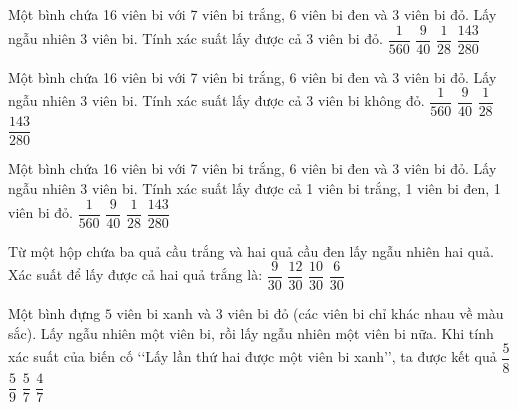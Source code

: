 \begin{ex}
Một bình chứa 16 viên bi với 7 viên bi trắng, 6 viên bi đen và 3 viên bi đỏ. Lấy ngẫu nhiên 3 viên bi. Tính xác suất lấy được cả 3 viên bi đỏ.
\choice
{\True $\dfrac{1}{560}$}
{$\dfrac{9}{40}$}
{$\dfrac{1}{28}$}
{$\dfrac{143}{280}$}
\end{ex}
\begin{ex}
Một bình chứa 16 viên bi với 7 viên bi trắng, 6 viên bi đen và 3 viên bi đỏ. Lấy ngẫu nhiên 3 viên bi. Tính xác suất lấy được cả 3 viên bi không đỏ.
\choice
{$\dfrac{1}{560}$}
{$\dfrac{9}{40}$}
{$\dfrac{1}{28}$}
{\True $\dfrac{143}{280}$}
\end{ex}
\begin{ex}
Một bình chứa 16 viên bi với 7 viên bi trắng, 6 viên bi đen và 3 viên bi đỏ. Lấy ngẫu nhiên 3 viên bi. Tính xác suất lấy được cả 1 viên bi trắng, 1 viên bi đen, 1 viên bi đỏ.
\choice
{$\dfrac{1}{560}$}
{\True $\dfrac{9}{40}$}
{$\dfrac{1}{28}$}
{$\dfrac{143}{280}$}
\end{ex}
\begin{ex}
Từ một hộp chứa ba quả cầu trắng và hai quả cầu đen lấy ngẫu nhiên hai quả. Xác suất để lấy được cả hai quả trắng là:
\choice
{\True $\dfrac{9}{30}$}
{$\dfrac{12}{30}$}
{$\dfrac{10}{30}$}
{$\dfrac{6}{30}$}
\end{ex}
\begin{ex}
Một bình đựng $5$ viên bi xanh và $3$ viên bi đỏ (các viên bi chỉ khác nhau về màu sắc). Lấy ngẫu nhiên một viên bi, rồi lấy ngẫu nhiên một viên bi nữa. Khi tính xác suất của biến cố \lq\lq Lấy lần thứ hai được một viên bi xanh\rq\rq , ta được kết quả
\choice
{\True $\dfrac{5}{8}$}
{$\dfrac{5}{9}$}
{$\dfrac{5}{7}$}
{$\dfrac{4}{7}$}
\end{ex}
